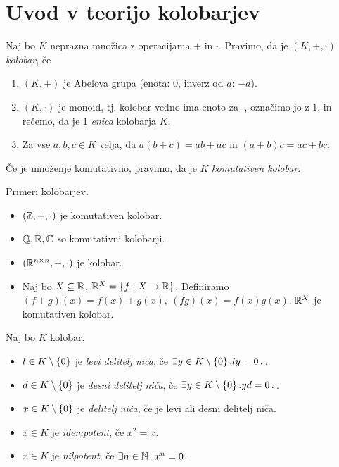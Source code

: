 \section{Uvod v teorijo kolobarjev}

\begin{definicija}
    Naj bo $K$ neprazna množica z operacijama $+$ in $\cdot$. Pravimo, da je $(K, +, \cdot)$ \emph{kolobar}, če
    \begin{enumerate}
        \item $(K, +)$ je Abelova grupa (enota: $0$, inverz od $a$: $-a$).
        \item $(K, \cdot)$ je monoid, tj. kolobar vedno ima enoto za $\cdot$, označimo jo z $1$, in rečemo, da je $1$ \emph{enica} kolobarja $K$.
        \item Za vse $a, b, c \in K$ velja, da $a(b+c) = ab+ac$ in $(a+b)c = ac+bc$.
    \end{enumerate}
    Če je množenje komutativno, pravimo, da je $K$ \emph{komutativen kolobar}.
\end{definicija}

\begin{zgled}
    Primeri kolobarjev.
    \begin{itemize}
        \item $(\mathbb{Z}, +, \cdot)$ je komutativen kolobar.
        \item $\mathbb{Q}, \mathbb{R}, \mathbb{C}$ so komutativni kolobarji.
        \item $(\mathbb{R}^{n \times n}, +, \cdot)$ je kolobar.
        \item Naj bo $X \subseteq \mathbb{R}$, $\mathbb{R}^X = \left\{f: X \to \mathbb{R}\right\}$. Definiramo $(f+g)(x) = f(x) + g(x), \ (fg)(x) = f(x)g(x)$. $\mathbb{R}^X$ je komutativen kolobar.
    \end{itemize}
\end{zgled}

\begin{definicija}
    Naj bo $K$ kolobar.
    \begin{itemize}
        \item $l \in K \setminus \left\{0\right\}$ je \emph{levi delitelj niča}, če $\exists y \in K \setminus \left\{0\right\}. ly = 0 \,.\,$.
        \item $d \in K \setminus \left\{0\right\}$ je \emph{desni delitelj niča}, če $\exists y \in K \setminus \left\{0\right\}. yd = 0 \,.\,$.
        \item $x \in K \setminus \left\{0\right\}$ je \emph{delitelj niča}, če je levi ali desni delitelj niča. 
        \item $x \in K$ je \emph{idempotent}, če $x^2 = x$.
        \item $x \in K$ je \emph{nilpotent}, če $\exists n \in \mathbb{N} \,.\, x^n = 0$.
    \end{itemize}
\end{definicija}

